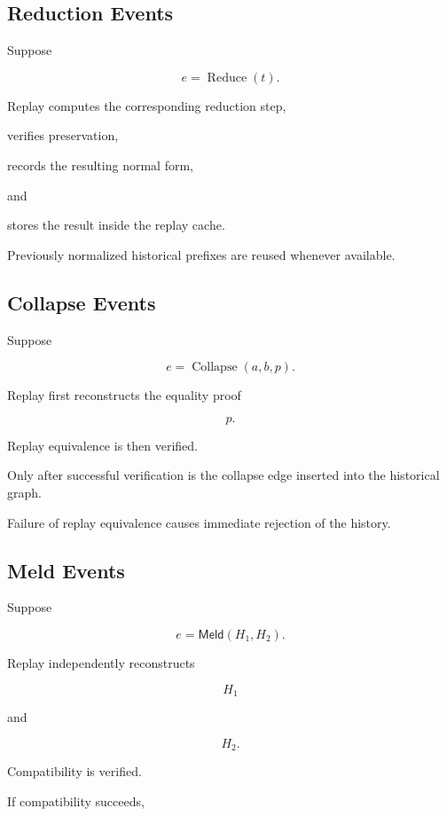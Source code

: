 \documentclass[12pt,oneside]{article}
\theoremstyle{definition}
\theoremstyle{remark}
\newcommand{\Meld}{\mathsf{Meld}}
\begin{document}

\subsection{Reduction Events}

Suppose

\[
e
=
\operatorname{Reduce}(t).
\]

Replay computes the corresponding reduction step,

verifies preservation,

records the resulting normal form,

and

stores the result inside the replay cache.

Previously normalized historical prefixes are reused whenever available.


\subsection{Collapse Events}

Suppose

\[
e
=
\operatorname{Collapse}(a,b,p).
\]

Replay first reconstructs the equality proof

\[
p.
\]

Replay equivalence is then verified.

Only after successful verification is the collapse edge inserted into the
historical graph.

Failure of replay equivalence causes immediate rejection of the history.


\subsection{Meld Events}

Suppose

\[
e
=
\Meld(H_1,H_2).
\]

Replay independently reconstructs

\[
H_1
\]

and

\[
H_2.
\]

Compatibility is verified.

If compatibility succeeds,
\end{document}
